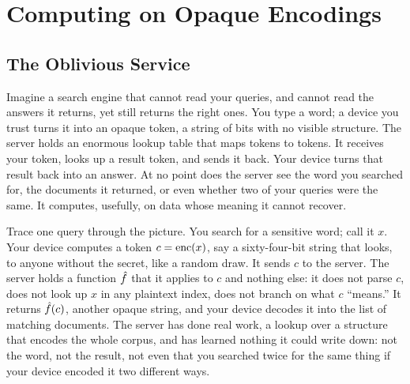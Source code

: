 
\chapter{Computing on Opaque Encodings}
\label{ch:opaque-encodings}

\section{The Oblivious Service}
\label{sec:oblivious-service}

Imagine a search engine that cannot read your queries, and cannot read the
answers it returns, yet still returns the right ones. You type a word; a
device you trust turns it into an opaque token, a string of bits with no
visible structure. The server holds an enormous lookup table that maps
tokens to tokens. It receives your token, looks up a result token, and
sends it back. Your device turns that result back into an answer. At no
point does the server see the word you searched for, the documents it
returned, or even whether two of your queries were the same. It computes,
usefully, on data whose meaning it cannot recover.

Trace one query through the picture. You search for a sensitive word; call
it $x$. Your device computes a token $c = \operatorname{enc}(x)$, say a sixty-four-bit
string that looks, to anyone without the secret, like a random draw. It
sends $c$ to the server. The server holds a function $\hat{f}$ that it
applies to $c$ and nothing else: it does not parse $c$, does not look up
$x$ in any plaintext index, does not branch on what $c$ ``means.'' It
returns $\hat{f}(c)$, another opaque string, and your device decodes it into
the list of matching documents. The server has done real work, a lookup
over a structure that encodes the whole corpus, and has learned nothing it
could write down: not the word, not the result, not even that you searched
twice for the same thing if your device encoded it two different ways.

